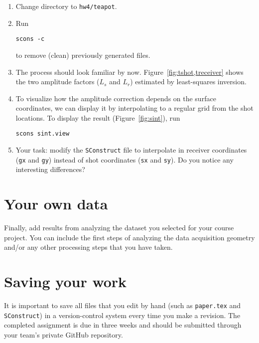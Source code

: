 \begin{enumerate}

\item Change directory to \texttt{hw4/teapot}.
\item Run
\begin{verbatim}
scons -c
\end{verbatim}
to remove (clean) previously generated files.
\item The process should look familiar by now. Figure~\ref{fig:tshot,treceiver} shows the two amplitude factors ($L_s$ and $L_r$) estimated by least-squares inversion.
\item To visualize how the amplitude correction depends on the surface coordinates, we can display it by interpolating to a regular grid from the shot locations. To display the result (Figure~\ref{fig:sint}), run
\begin{verbatim}
scons sint.view
\end{verbatim}
\item Your task: modify the \texttt{SConstruct} file to interpolate in receiver coordinates (\texttt{gx} and \texttt{gy}) instead of shot coordinates (\texttt{sx} and \texttt{sy}). Do you notice any interesting differences?

\end{enumerate}



\lstset{language=python,numbers=left,numberstyle=\tiny,showstringspaces=false}


\section{Your own data}

Finally, add results from analyzing the dataset you selected for your
course project. You can include the first steps of analyzing the data
acquisition geometry and/or any other processing steps that you have
taken.

\section{Saving your work}

It is important to save all files that you edit by hand (such
as \texttt{paper.tex} and \texttt{SConstruct}) in a version-control
system every time you make a revision.  The completed assignment is
due in three weeks and should be submitted through your team's private
GitHub repository.





